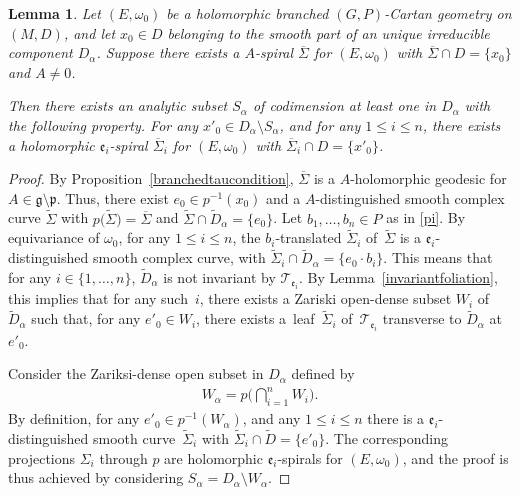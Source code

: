 \documentclass[10pt,a4paper]{amsart}
\numberwithin{equation}{section}
\newtheorem{Lemma}[Theorem]{Lemma}
\begin{document}
\begin{Lemma}\label{lemmageodesicaffine} Let $(E,\omega_0)$ be a holomorphic branched $(G,P)$-Cartan geometry on $(M,D)$, and let $x_0 \in D$ belonging to the smooth part of an unique irreducible component $D_\alpha$. Suppose there exists a $A$-spiral $\overline{\Sigma}$ for $(E,\omega_0)$ with $\overline{\Sigma}\cap D=\{x_0\}$ and $A\neq 0$.

Then there exists an analytic subset $S_\alpha$ of codimension at least one in $D_\alpha$ with the following property. For any $x'_0 \in D_\alpha \setminus S_\alpha$, and for any $1\leq i\leq n$, there exists a holomorphic $\mathfrak{e}_i$-spiral $\overline{\Sigma}_i$ for $(E,\omega_0)$ with $\overline{\Sigma}_i \cap D =\{x'_0\}$.
\end{Lemma}

\begin{proof} By Proposition~\ref{branchedtaucondition}, $\overline{\Sigma}$ is a $A$-holomorphic geodesic for $A\in \mathfrak{g}\setminus \mathfrak{p}$. Thus, there exist $e_0 \in p^{-1}(x_0)$ and a $A$-distinguished smooth complex curve $\tilde{\Sigma}$ with $p\big(\tilde{\Sigma}\big)=\overline{\Sigma}$ and $\tilde{\Sigma} \cap \tilde{D}_\alpha =\{e_0\}$. Let $b_1,\dots,b_n \in P$ as in \eqref{pi}. By equivariance of $\omega_0$, for any $1\leq i \leq n$, the $b_i$-translated $\tilde{\Sigma}_i$ of~$\tilde{\Sigma}$ is a $\mathfrak{e}_i$-distinguished smooth complex curve, with $\tilde{\Sigma}_i \cap \tilde{D}_\alpha = \{e_0 \cdot b_i\}$. This means that for any $i\in \{1,\dots,n\}$, $\tilde{D}_\alpha$ is not invariant by $\mathcal{T}_{\mathfrak{e}_i}$. By Lemma~\ref{invariantfoliation}, this implies that for any such~$i$, there exists a Zariski open-dense subset $W_i$ of $\tilde{D}_\alpha$ such that, for any $e'_0 \in W_i$, there exists a~leaf~$\tilde{\Sigma}_i$ of~$\mathcal{T}_{\mathfrak{e}_i}$ transverse to $\tilde{D}_\alpha$ at $e'_0$.

Consider the Zariksi-dense open subset in $D_\alpha$ defined by
 \begin{gather*} W_\alpha= p\bigg(\bigcap_{i=1}^{n} W_i\bigg). \end{gather*}
 By definition, for any $e'_0 \in p^{-1}(W_\alpha)$, and any $1\leq i \leq n$ there is a $\mathfrak{e}_i$-distinguished smooth curve~$\tilde{\Sigma}_i$ with $\tilde{\Sigma}_i \cap \tilde{D}=\{e'_0\}$. The corresponding projections $\Sigma_i$ through $p$ are holomorphic $\mathfrak{e}_i$-spirals for $(E,\omega_0)$, and the proof is thus achieved by considering $S_\alpha=D_\alpha\setminus W_\alpha$.
\end{proof}
\end{document}
